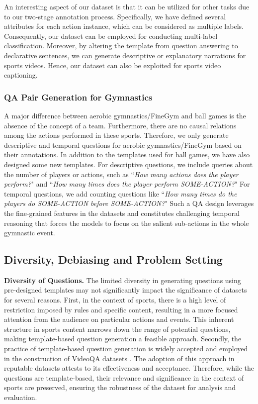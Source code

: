 An interesting aspect of our dataset is that it can be utilized for other tasks due to our two-stage annotation process. Specifically, we have defined several attributes for each action instance, which can be considered as multiple labels. Consequently, our dataset can be employed for conducting multi-label classification.
Moreover, by altering the template from question answering to declarative sentences, we can generate descriptive or explanatory narrations for sports videos. Hence, our dataset can also be exploited for sports video captioning.

\subsubsection{QA Pair Generation for Gymnastics}

A major difference between aerobic gymnastics/FineGym and ball games is the absence of the concept of a team. Furthermore, there are no causal relations among the actions performed in these sports. Therefore, we only generate descriptive and temporal questions for aerobic gymnastics/FineGym based on their annotations. In addition to the templates used for ball games, we have also designed some new templates. For descriptive questions, we include queries about the number of players or actions, such as ``\textit{How many actions does the player perform?}" and ``\textit{How many times does the player perform SOME-ACTION?}" For temporal questions, we add counting questions like ``\textit{How many times do the players do SOME-ACTION before SOME-ACTION?}" Such a QA design leverages the fine-grained features in the datasets and constitutes challenging temporal reasoning that forces the models to focus on the salient sub-actions in the whole gymnastic event.

\subsection{Diversity, Debiasing and Problem Setting}

\noindent \textbf{Diversity of Questions.} The limited diversity in generating questions using pre-designed templates may not significantly impact the significance of datasets for several reasons. First, in the context of sports, there is a high level of restriction imposed by rules and specific content, resulting in a more focused attention from the audience on particular actions and events. This inherent structure in sports content narrows down the range of potential questions, making template-based question generation a feasible approach.
Secondly, the practice of template-based question generation is widely accepted and employed in the construction of VideoQA datasets \citep{jang2017tgif, xu2017video, yang2021just}. 
The adoption of this approach in reputable datasets attests to its effectiveness and acceptance. Therefore, while the questions are template-based, their relevance and significance in the context of sports are preserved, ensuring the robustness of the dataset for analysis and evaluation.

